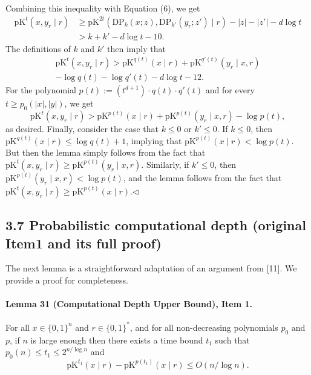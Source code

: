 \documentclass[10pt,a4paper]{article}
\begin{document}
Combining this inequality with Equation (6), we get
\begin{align*}
\mathrm{pK}^t(x,y_r\mid r)
&\geq\mathrm{pK}^{2t}(\mathrm{DP}_k(x;z),\mathrm{DP}_{k'}(y_r;z')\mid r)-|z|-|z'|-d\log t\\
&>k+k'-d\log t-10.\tag{12}
\end{align*}
The definitions of $k$ and $k'$ then imply that
\begin{multline*}
\mathrm{pK}^t(x,y_r\mid r)>\mathrm{pK}^{q(t)}(x\mid r)+\mathrm{pK}^{q'(t)}(y_r\mid x,r)\\
-\log q(t)-\log q'(t)-d\log t-12.
\end{multline*}
For the polynomial $p(t):=(t^{d+1})\cdot q(t)\cdot q'(t)$ and for every $t\geq p_0(|x|,|y|)$, we get
\[\mathrm{pK}^t(x,y_r\mid r)>\mathrm{pK}^{p(t)}(x\mid r)+\mathrm{pK}^{p(t)}(y_r\mid x,r)-\log p(t),\]
as desired.
Finally, consider the case that $k\leq0$ or $k'\leq0$. If $k\leq0$, then $\mathrm{pK}^{q(t)}(x\mid r)\leq\log q(t)+1$, implying that $\mathrm{pK}^{p(t)}(x\mid r)<\log p(t)$. But then the lemma simply follows from the fact that $\mathrm{pK}^t(x,y_r\mid r)\geq\mathrm{pK}^{p(t)}(y_r\mid x,r)$. Similarly, if $k'\leq0$, then $\mathrm{pK}^{p(t)}(y_r\mid x,r)<\log p(t)$, and the lemma follows from the fact that $\mathrm{pK}^t(x,y_r\mid r)\geq\mathrm{pK}^{p(t)}(x\mid r)$.\hfill$\triangleleft$
\subsection*{3.7 Probabilistic computational depth (original Item1 and its full proof)}
The next lemma is a straightforward adaptation of an argument from [11]. We provide a proof for completeness.
\paragraph{Lemma 31 (Computational Depth Upper Bound), Item 1.} For all $x\in\{0,1\}^n$ and $r\in\{0,1\}^*$, and for all non-decreasing polynomials $p_0$ and $p$, if $n$ is large enough then there exists a time bound $t_1$ such that $p_0(n)\leq t_1\leq2^{n/\log n}$ and
\[\mathrm{pK}^{t_1}(x\mid r)-\mathrm{pK}^{p(t_1)}(x\mid r)\leq O(n/\log n).\]
\end{document}
